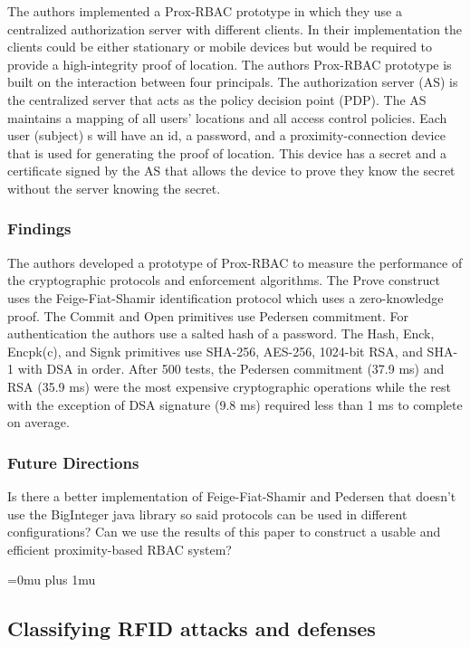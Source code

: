 \noindent
The authors implemented a Prox-RBAC prototype in which they use a centralized authorization server with different clients. In their implementation the clients could be either stationary or mobile devices but would be required to provide a high-integrity proof of location. The authors Prox-RBAC prototype is built on the interaction between four principals. The authorization server (AS) is the centralized server that acts as the policy decision point (PDP). The AS maintains a mapping of all users’ locations and all access control policies. Each user (subject) s will have an id, a password, and a proximity-connection device that is used for generating the proof of location. This device has a secret and a certificate signed by the AS that allows the device to prove they know the secret without the server knowing the secret.

\subsubsection{Findings}

\noindent
The authors developed a prototype of Prox-RBAC to measure the performance of the cryptographic protocols and enforcement algorithms. The Prove construct uses the Feige-Fiat-Shamir identification protocol which uses a zero-knowledge proof. The Commit and Open primitives use Pedersen commitment. For authentication the authors use a salted hash of a password. The Hash, Enck, Encpk(c), and Signk primitives use SHA-256, AES-256, 1024-bit RSA, and SHA-1 with DSA in order. After 500 tests, the Pedersen commitment (37.9 ms) and RSA (35.9 ms) were the most expensive cryptographic operations while the rest with the exception of DSA signature (9.8 ms) required less than 1 ms to complete on average. 

\subsubsection{Future Directions}

\noindent
Is there a better implementation of Feige-Fiat-Shamir and Pedersen that doesn’t use the BigInteger java library so said protocols can be used in different configurations? Can we use the results of this paper to construct a usable and efficient proximity-based RBAC system?

\Urlmuskip=0mu plus 1mu\relax


\noindent
\subsection{Classifying RFID attacks and defenses}

